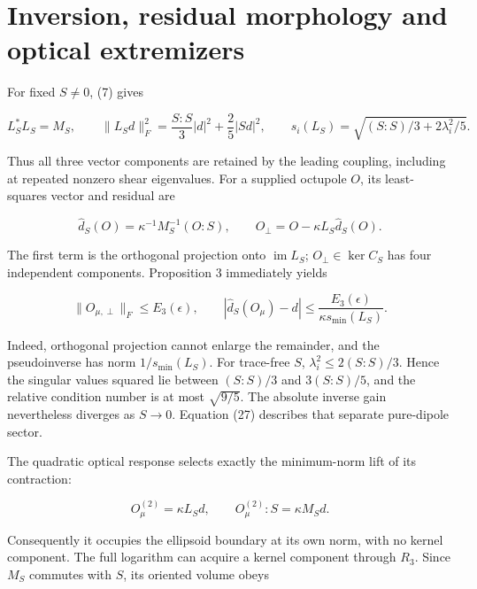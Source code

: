 \documentclass[aps,prd,reprint,onecolumn,11pt,nofootinbib,notitlepage]{revtex4-2}
\begin{document}
\section{Inversion, residual morphology and optical extremizers}

For fixed \(S\ne0\), (7) gives

\begin{equation}
 L_S^*L_S=M_S,\qquad
 \|L_Sd\|_F^2=\frac{S:S}{3}|d|^2+\frac25|Sd|^2,\qquad
 s_i(L_S)=\sqrt{(S:S)/3+2\lambda_i^2/5}.
 \tag{30}
\end{equation}

Thus all three vector components are retained by the leading coupling, including at repeated nonzero shear eigenvalues. For a supplied octupole \(O\), its least-squares vector and residual are

\begin{equation}
 \widehat d_S(O)=\kappa^{-1}M_S^{-1}(O:S),\qquad
 O_\perp=O-\kappa L_S\widehat d_S(O).
 \tag{31}
\end{equation}

The first term is the orthogonal projection onto \(\operatorname{im}L_S\); \(O_\perp\in\ker C_S\) has four independent components. Proposition 3 immediately yields

\begin{equation}
 \|O_{\mu,\perp}\|_F\le E_3(\epsilon),\qquad
 |\widehat d_S(O_\mu)-d|
 \le\frac{E_3(\epsilon)}{\kappa s_{\min}(L_S)}.
 \tag{32}
\end{equation}

Indeed, orthogonal projection cannot enlarge the remainder, and the pseudoinverse has norm \(1/s_{\min}(L_S)\). For trace-free \(S\), \(\lambda_i^2\le2(S:S)/3\). Hence the singular values squared lie between \((S:S)/3\) and \(3(S:S)/5\), and the relative condition number is at most \(\sqrt{9/5}\). The absolute inverse gain nevertheless diverges as \(S\to0\). Equation (27) describes that separate pure-dipole sector.

The quadratic optical response selects exactly the minimum-norm lift of its contraction:

\begin{equation}
 O_\mu^{(2)}=\kappa L_Sd,\qquad O_\mu^{(2)}:S=\kappa M_Sd.
 \tag{33}
\end{equation}

Consequently it occupies the ellipsoid boundary at its own norm, with no kernel component. The full logarithm can acquire a kernel component through \(R_3\). Since \(M_S\) commutes with \(S\), its oriented volume obeys
\end{document}
